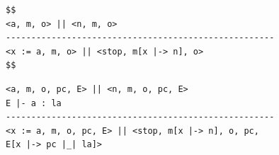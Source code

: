 \documentclass[sigplan,10pt,screen]{acmart}
\begin{document}

\begin{figure}[h]
\begin{minipage}[t]{0.49\linewidth}
\begin{lstlisting}
$$
<a, m, o> || <n, m, o>
-----------------------------------------------------
<x := a, m, o> || <stop, m[x |-> n], o>
$$
\end{lstlisting}        
\end{minipage}
\hfill%
\begin{minipage}[t]{0.49\linewidth}
\begin{lstlisting}
<a, m, o, pc, E> || <n, m, o, pc, E>
E |- a : la
-----------------------------------------------------
<x := a, m, o, pc, E> || <stop, m[x |-> n], o, pc, 
E[x |-> pc |_| la]>
\end{lstlisting}
\end{minipage}
\end{figure}
\end{document}
